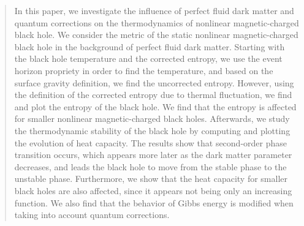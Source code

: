 \documentclass[10pt,letterpaper]{article}
\begin{document}
\begin{abstract}
	
		In this paper, we investigate the influence of perfect fluid dark matter and quantum corrections on the thermodynamics of nonlinear magnetic-charged black hole. We consider the metric of the static nonlinear magnetic-charged black hole in the background of perfect fluid dark matter. Starting with the black hole temperature and the corrected entropy, we use the event horizon propriety in order to find the temperature, and based on the surface gravity definition, we find the uncorrected entropy. However, using the definition of the corrected entropy due to thermal fluctuation, we find and plot the entropy of the black hole. We find that the entropy is affected for smaller nonlinear magnetic-charged black holes. Afterwards, we study the thermodynamic stability of the black hole by computing and plotting the evolution of heat capacity. The results show that second-order phase transition occurs, which appears more later as the dark matter parameter decreases, and leads the black hole to move from the stable phase to the unstable phase. Furthermore, we show that the heat capacity for smaller black holes are also affected, since it appears not being only an increasing function. We also find that the behavior of Gibbs energy is modified when taking into account quantum corrections.
	
	
	
\end{abstract}
\end{document}
